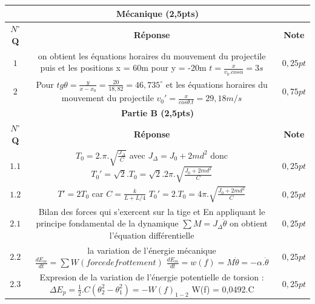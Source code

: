 \documentclass[12pt]{article}
\begin{document}
\begin{center}
	 \begin{tabular}{|c||c||c|}
	\hline

		 \multicolumn{3}{||c||}{\bf{   \hfill Mécanique \hfill (2,5pts)} }\\\hline
	\textbf{$N^{\circ}$Q } & \textbf{Réponse } & \textbf{Note }\\
	\hline

	$1$ &
	\makecell{ on obtient les équations horaires du mouvement du projectile puis et les positions\\ x = 60m pour y = -20m \\
	$t = \frac{x}{v_0.cos\alpha} = 3s$}
	
	& $0,25pt$\\\hline  
	$2$ &
	\makecell{Pour $tg\theta = \frac{y}{x-x_0} = \frac{20}{18,82} = 46,735^{\circ}$ et les équations horaires du mouvement du projectile\\
	$v_0' = \frac{x}{cos\theta. t } = 29,18m/s$}
	
	& $0,75pt$\\\hline  


		 \multicolumn{3}{||c||}{\bf{   \hfill Partie B  \hfill (2,5pts)} }\\\hline
	\textbf{$N^{\circ}$Q } & \textbf{Réponse } & \textbf{Note }\\
	\hline
	$1.1$ &
	\makecell{ $T_0 = 2.\pi.\sqrt{\frac{J_\Delta}{C}}$  avec  $J_{\Delta} = J_0 + 2md^2$\\
		donc $T_0' = \sqrt{2}.T_0 =  \sqrt{2}.2\pi.\sqrt{\frac{J_0 + 2md^2}{C}}$
	}
	
	& $0,25pt$\\\hline  
	$1.2$ &
	\makecell{ 	$T' = 2T_0$	car $C = \frac{k}{L + L/4}$ \\ $T_0' = 2.T_0 =  4\pi.\sqrt{\frac{J_0 + 2md^2}{C}}$
	}
	
	& $0,25pt$\\\hline  

	$2.1$ &
	\makecell{
		Bilan des forces qui s'exercent sur la tige et En appliquant \\le principe fondamental de la dynamique $\sum M = J_\Delta \ddot{\theta}$
		\\on obtient l’équation différentielle
	}
	
	& $0,25pt$\\\hline  
	$2.2$ &
	\makecell{
		la variation de l’énergie mécanique $\frac{dE_m}{dt} = \sum W(force de frottement)$\\ $\frac{dE_m}{dt} = w(f) = M\dot{\theta} =- \alpha.\dot{\theta}$
}	
	& $0,25pt$\\\hline  
	$2.3$ &
	\makecell{
	Expresion de la variation de l'énergie potentielle de torsion :         \\ $\Delta{E_p} = \frac{1}{2}.C(\theta^2_2 - \theta^2_1 ) = -W(f)_{1-2}$
	\\W(f) = 0,0492.C
	}	
	& $0,25pt$\\\hline  











\end{tabular}
\end{center}
\end{document}
